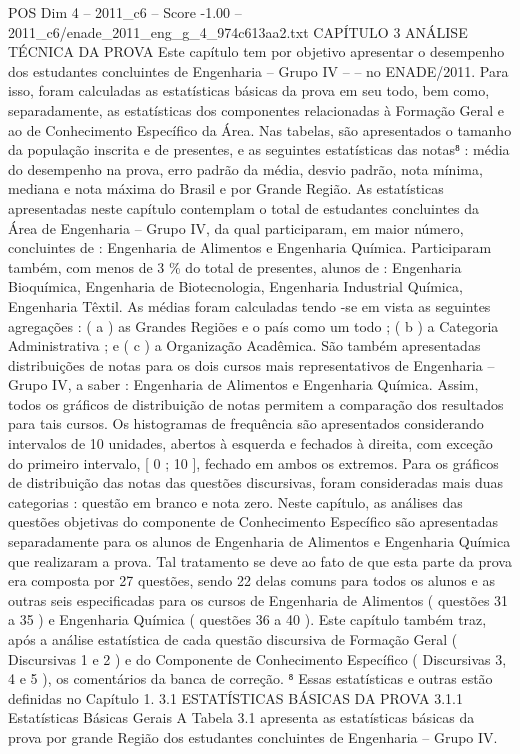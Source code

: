 \begin{textsample}{POS Dim 4 – 2011\_c6 – Score -1.00 – 2011\_c6/enade\_2011\_eng\_g\_4\_974c613aa2.txt}  \label{ex:f4_pos_307}
CAPÍTULO 3 ANÁLISE TÉCNICA DA PROVA Este capítulo tem por objetivo apresentar o desempenho dos estudantes concluintes de Engenharia – Grupo IV – – no ENADE/2011.
Para isso, foram calculadas as estatísticas básicas da prova em seu todo, bem como, separadamente, as estatísticas dos componentes relacionadas à Formação Geral e ao de Conhecimento Específico da Área.
Nas tabelas, são apresentados o tamanho da população inscrita e de presentes, e as seguintes estatísticas das notas⁸ : média do desempenho na prova, erro padrão da média, desvio padrão, nota mínima, mediana e nota máxima do Brasil e por Grande Região.
As estatísticas apresentadas neste capítulo contemplam o total de estudantes concluintes da Área de Engenharia – Grupo IV, da qual participaram, em maior número, concluintes de : Engenharia de Alimentos e Engenharia Química.
Participaram também, com menos de 3 \% do total de presentes, alunos de : Engenharia Bioquímica, Engenharia de Biotecnologia, Engenharia Industrial Química, Engenharia Têxtil.
As médias foram calculadas tendo -se em vista as seguintes agregações : ( a ) as Grandes Regiões e o país como um todo ; ( b ) a Categoria Administrativa ; e ( c ) a Organização Acadêmica.
São também apresentadas distribuições de notas para os dois cursos mais representativos de Engenharia – Grupo IV, a saber : Engenharia de Alimentos e Engenharia Química.
Assim, todos os gráficos de distribuição de notas permitem a comparação dos resultados para tais cursos.
Os histogramas de frequência são apresentados considerando intervalos de 10 unidades, abertos à esquerda e fechados à direita, com exceção do primeiro intervalo, [ 0 ; 10 ], fechado em ambos os extremos.
Para os gráficos de distribuição das notas das questões discursivas, foram consideradas mais duas categorias : questão em branco e nota zero.
Neste capítulo, as análises das questões objetivas do componente de Conhecimento Específico são apresentadas separadamente para os alunos de Engenharia de Alimentos e Engenharia Química que realizaram a prova.
Tal tratamento se deve ao fato de que esta parte da prova era composta por 27 questões, sendo 22 delas comuns para todos os alunos e as outras seis especificadas para os cursos de Engenharia de Alimentos ( questões 31 a 35 ) e Engenharia Química ( questões 36 a 40 ).
Este capítulo também traz, após a análise estatística de cada questão discursiva de Formação Geral ( Discursivas 1 e 2 ) e do Componente de Conhecimento Específico ( Discursivas 3, 4 e 5 ), os comentários da banca de correção. ⁸ Essas estatísticas e outras estão definidas no Capítulo 1. 3.1 ESTATÍSTICAS BÁSICAS DA PROVA 3.1.1 Estatísticas Básicas Gerais A Tabela 3.1 apresenta as estatísticas básicas da prova por grande Região dos estudantes concluintes de Engenharia – Grupo IV.

\end{textsample}
